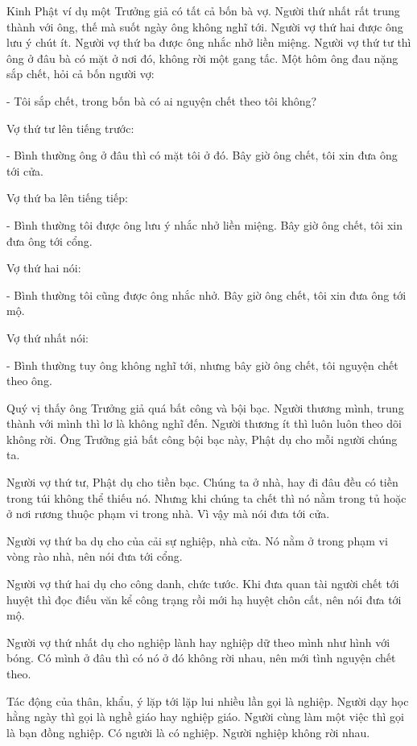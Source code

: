 \documentclass[
  12pt,
  oneside]{book}
\begin{document}
Kinh Phật ví dụ một Trưởng giả có tất cả bốn bà vợ. Người thứ nhất rất trung thành với ông, thế mà suốt ngày ông không nghĩ tới. Người vợ thứ hai được ông lưu ý chút ít. Người vợ thứ ba được ông nhắc nhở liền miệng. Người vợ thứ tư thì ông ở đâu bà có mặt ở nơi đó, không rời một gang tấc. Một hôm ông đau nặng sắp chết, hỏi cả bốn người vợ:

- Tôi sắp chết, trong bốn bà có ai nguyện chết theo tôi không?

Vợ thứ tư lên tiếng trước:

- Bình thường ông ở đâu thì có mặt tôi ở đó. Bây giờ ông chết, tôi xin đưa ông tới cửa.

Vợ thứ ba lên tiếng tiếp:

- Bình thường tôi được ông lưu ý nhắc nhở liền miệng. Bây giờ ông chết, tôi xin đưa ông tới cổng.

Vợ thứ hai nói:

- Bình thường tôi cũng được ông nhắc nhở. Bây giờ ông chết, tôi xin đưa ông tới mộ.

Vợ thứ nhất nói:

- Bình thường tuy ông không nghĩ tới, nhưng bây giờ ông chết, tôi nguyện chết theo ông.

Quý vị thấy ông Trưởng giả quá bất công và bội bạc. Người thương mình, trung thành với mình thì lơ là không nghĩ đến. Người thương ít thì luôn luôn theo dõi không rời. Ông Trưởng giả bất công bội bạc này, Phật dụ cho mỗi người chúng ta.

Người vợ thứ tư, Phật dụ cho tiền bạc. Chúng ta ở nhà, hay đi đâu đều có tiền trong túi không thể thiếu nó. Nhưng khi chúng ta chết thì nó nằm trong tủ hoặc ở nơi rương thuộc phạm vi trong nhà. Vì vậy mà nói đưa tới cửa.

Người vợ thứ ba dụ cho của cải sự nghiệp, nhà cửa. Nó nằm ở trong phạm vi vòng rào nhà, nên nói đưa tới cổng.

Người vợ thứ hai dụ cho công danh, chức tước. Khi đưa quan tài người chết tới huyệt thì đọc điếu văn kể công trạng rồi mới hạ huyệt chôn cất, nên nói đưa tới mộ.

Người vợ thứ nhất dụ cho nghiệp lành hay nghiệp dữ theo mình như hình với bóng. Có mình ở đâu thì có nó ở đó không rời nhau, nên mới tình nguyện chết theo.

Tác động của thân, khẩu, ý lặp tới lặp lui nhiều lần gọi là nghiệp. Người dạy học hằng ngày thì gọi là nghề giáo hay nghiệp giáo. Người cùng làm một việc thì gọi là bạn đồng nghiệp. Có người là có nghiệp. Người nghiệp không rời nhau.
\end{document}
